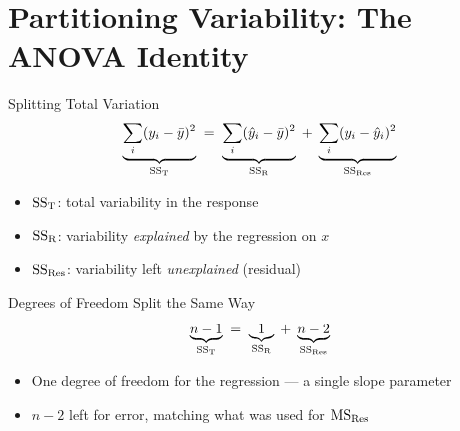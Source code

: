 

\section{Partitioning Variability: The ANOVA Identity}


\begin{frame}{Splitting Total Variation}
	\[
		\underbrace{\sum_i(y_i-\bar y)^2}_{\mathrm{SS}_{\mathrm{T}}} \;=\; \underbrace{\sum_i(\hat y_i-\bar y)^2}_{\mathrm{SS}_{\mathrm{R}}} \;+\; \underbrace{\sum_i(y_i-\hat y_i)^2}_{\mathrm{SS}_{\mathrm{Res}}}
	\]

	\begin{itemize}
		\item $\mathrm{SS}_{\mathrm{T}}$: total variability in the response
		\item $\mathrm{SS}_{\mathrm{R}}$: variability \emph{explained} by the regression on $x$
		\item $\mathrm{SS}_{\mathrm{Res}}$: variability left \emph{unexplained} (residual)
	\end{itemize}
\end{frame}


\begin{frame}{Degrees of Freedom Split the Same Way}
	\[
		\underbrace{n-1}_{\mathrm{SS}_{\mathrm{T}}} \;=\; \underbrace{1}_{\mathrm{SS}_{\mathrm{R}}} \;+\; \underbrace{n-2}_{\mathrm{SS}_{\mathrm{Res}}}
	\]

	\begin{itemize}
		\item One degree of freedom for the regression --- a single slope parameter
		\item $n-2$ left for error, matching what was used for $\mathrm{MS}_{\mathrm{Res}}$
	\end{itemize}
\end{frame}


